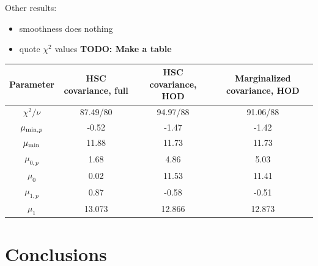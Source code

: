 \documentclass[a4paper,11pt]{article}
\newcommand{\todo}[1]{{\bf TODO: #1}}
\begin{document}
Other results:
\begin{itemize}
  \item smoothness does nothing
  \item quote $\chi^2$ values \todo{Make a table}
\end{itemize}



\begin{center}
 \begin{tabular}{c | c c c} 
 \hline\hline
 Parameter & HSC covariance, full & HSC covariance, HOD & Marginalized covariance, HOD \\ [0.5ex] 
 \hline
 $\chi^2/\nu$ & 87.49/80 & 94.97/88 & 91.06/88 \\ 

 $\mu_{{\rm min},p}$ & -0.52 & -1.47 & -1.42 \\

 $\mu_{\rm min}$ & 11.88 & 11.73 & 11.73 \\

 $\mu_{0,p}$ & 1.68 & 4.86 & 5.03 \\
 
 $\mu_{0}$ & 0.02 & 11.53 & 11.41 \\

 $\mu_{1,p}$ & 0.87 & -0.58 & -0.51 \\

 $\mu_{1}$ & 13.073 & 12.866 & 12.873 \\ [1ex] 
 \hline
 \hline
\end{tabular}
\end{center}


\section{Conclusions}



\end{document}
